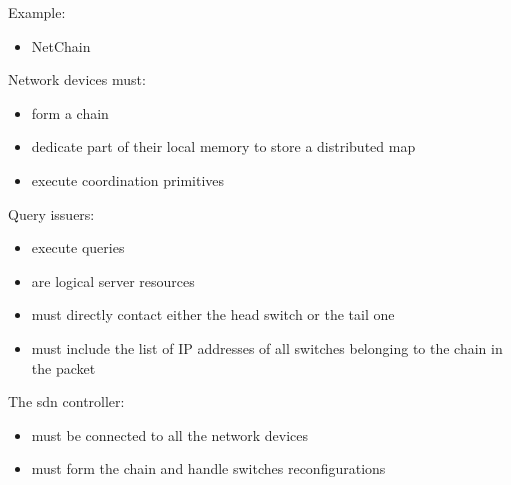 Example:
\begin{itemize}
    \item NetChain \cite{netchain}
\end{itemize}
Network devices must:
\begin{itemize}
    \item form a chain
    \item dedicate part of their local memory to store a distributed map
    \item execute coordination primitives
\end{itemize}
Query issuers:
\begin{itemize}
    \item execute queries
    \item are logical server resources
    \item must directly contact either the head switch or the tail one
    \item must include the list of IP addresses of all switches belonging to the chain in the packet
\end{itemize}
The \gls{sdn} controller:
\begin{itemize}
    \item must be connected to all the network devices
    \item must form the chain and handle switches reconfigurations
\end{itemize}